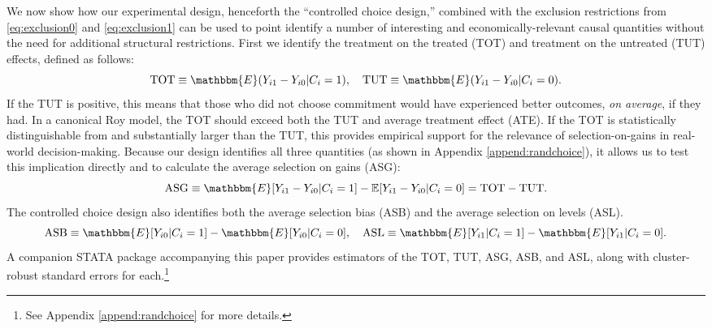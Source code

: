 \documentclass[oneside,11pt]{article}
\begin{document}
We now show how our experimental design, henceforth the ``controlled choice design,'' combined with the exclusion restrictions from \eqref{eq:exclusion0} and \eqref{eq:exclusion1} can be used to point identify a number of interesting and economically-relevant causal quantities without the need for additional structural restrictions.
First we identify the treatment on the treated (TOT) and treatment on the untreated (TUT) effects, defined as follows:
\[
\text{TOT} \equiv \mathbbm{E}(Y_{i1} - Y_{i0} | C_i = 1), \quad
\text{TUT} \equiv \mathbbm{E}(Y_{i1} - Y_{i0} | C_i = 0).
\]
If the TUT is positive, this means that those who did not choose commitment would have experienced better outcomes, \emph{on average}, if they had. 
In a canonical Roy model, the TOT should exceed both the TUT and average treatment effect (ATE).
If the TOT is statistically distinguishable from and substantially larger than the TUT, this provides empirical support for the relevance of selection-on-gains in real-world decision-making.
Because our design identifies all three quantities (as shown in Appendix \ref{append:randchoice}), it allows us to test this implication directly and to calculate the average selection on gains (ASG):
\[
\text{ASG} \equiv \mathbbm{E}[Y_{i1} - Y_{i0}|C_i = 1] - \mathbb{E}[Y_{i1} - Y_{i0} | C_i = 0] = \text{TOT} - \text{TUT}.
\]
The controlled choice design also identifies both the average selection bias (ASB) and the average selection on levels (ASL). 
\[
\text{ASB} \equiv \mathbbm{E}[Y_{i0}|C_i = 1] - \mathbbm{E}[Y_{i0}|C_i = 0], \quad 
\text{ASL} \equiv \mathbbm{E}[Y_{i1}|C_i = 1] - \mathbbm{E}[Y_{i1}|C_i = 0].
\]
A companion STATA package accompanying this paper provides estimators of the TOT, TUT, ASG, ASB, and ASL, along with cluster-robust standard errors for each.\footnote{See Appendix \ref{append:randchoice} for more details.}
\end{document}
